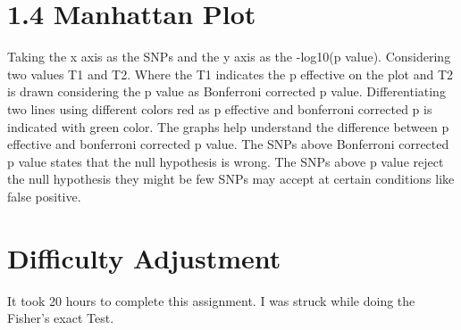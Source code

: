\documentclass{article}
\begin{document}
\section*{1.4 Manhattan Plot}
{\large Taking the x axis as the SNPs and the y axis as the -log10(p value).
Considering two values T1 and T2. Where the T1 indicates the p effective on the plot and T2 is drawn considering the p value as Bonferroni corrected p value.
Differentiating two lines using different colors red as p effective and bonferroni
corrected p is indicated with green color.
\newline The graphs help understand the difference between p effective and bonferroni corrected p value.
\newline The SNPs above Bonferroni corrected p value states that the null hypothesis is wrong. The SNPs above p value reject the null hypothesis they might be few SNPs may accept at certain conditions like false positive.}

\graphicspath{ {./image/} }

\section*{Difficulty Adjustment}
{\large It took 20 hours to complete this assignment.
\newline I was struck while doing the Fisher's exact Test.}
\end{document}
